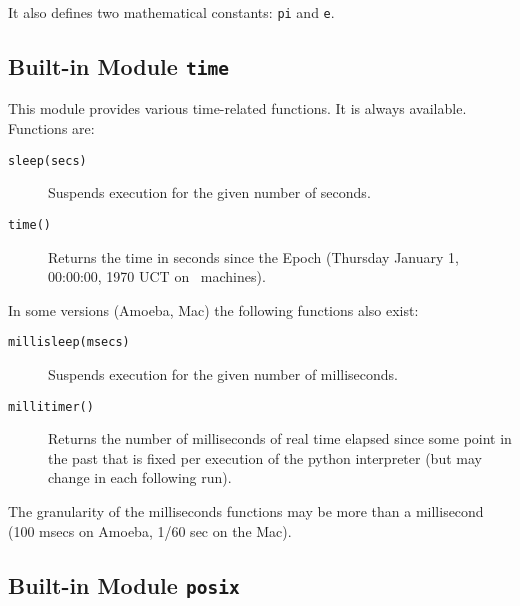 It also defines two mathematical constants:
{\tt pi}
and
{\tt e}.

\subsection{Built-in Module {\tt time}}

This module provides various time-related functions.
It is always available.
Functions are:
\begin{description}
\item[{\tt sleep(secs)}]
Suspends execution for the given number of seconds.
\item[{\tt time()}]
Returns the time in seconds since the Epoch (Thursday January 1,
00:00:00, 1970 UCT on \UNIX\ machines).
\end{description}

\noindent
In some versions (Amoeba, Mac) the following functions also exist:
\begin{description}
\item[{\tt millisleep(msecs)}]
Suspends execution for the given number of milliseconds.
\item[{\tt millitimer()}]
Returns the number of milliseconds of real time elapsed since some point
in the past that is fixed per execution of the python interpreter (but
may change in each following run).
\end{description}

\noindent
The granularity of the milliseconds functions may be more than a
millisecond (100 msecs on Amoeba, 1/60 sec on the Mac).

\subsection{Built-in Module {\tt posix}}

